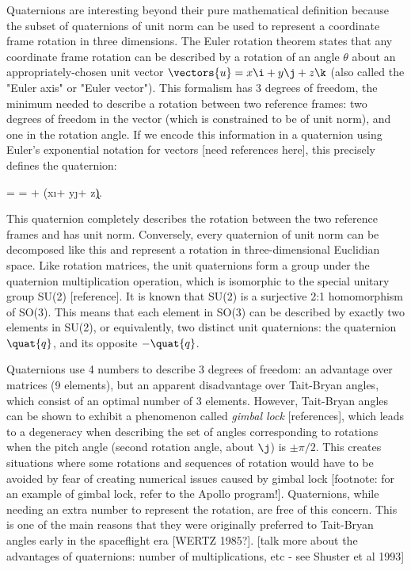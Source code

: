 Quaternions are interesting beyond their pure mathematical definition because the subset of quaternions of unit norm can be used to represent a coordinate frame rotation in three dimensions. The Euler rotation theorem states that any coordinate frame rotation can be described by a rotation of an angle $\theta$ about an appropriately-chosen unit vector $\vectors{u} = x\i + y\j + z\k$ (also called the "Euler axis" or "Euler vector"). This formalism has 3 degrees of freedom, the minimum needed to describe a rotation between two reference frames: two degrees of freedom in the vector (which is constrained to be of unit norm), and one in the rotation angle. If we encode this information in a quaternion using Euler's exponential notation for vectors [need references here], this precisely defines the quaternion:
\begin{equations}
 = \exp{} = \cos{} + (x\i + y\j + z\k)\sin{}.
\end{equations}
This quaternion completely describes the rotation between the two reference frames and has unit norm. Conversely, every quaternion of unit norm can be decomposed like this and represent a rotation in three-dimensional Euclidian space. Like rotation matrices, the unit quaternions form a group under the quaternion multiplication operation, which is isomorphic to the special unitary group SU(2) [reference]. It is known that SU(2) is a surjective 2:1 homomorphism of SO(3). This means that each element in SO(3) can be described by exactly two elements in SU(2), or equivalently, two distinct unit quaternions: the quaternion $\quat{q}$, and its opposite $-\quat{q}$.

Quaternions use 4 numbers to describe 3 degrees of freedom: an advantage over matrices (9 elements), but an apparent disadvantage over Tait-Bryan angles, which consist of an optimal number of 3 elements. However, Tait-Bryan angles can be shown to exhibit a phenomenon called \textit{gimbal lock} [references], which leads to a degeneracy when describing the set of angles corresponding to rotations when the pitch angle (second rotation angle, about $\j$) is $\pm\pi/2$. This creates situations where some rotations and sequences of rotation would have to be avoided by fear of creating numerical issues caused by gimbal lock [footnote: for an example of gimbal lock, refer to the Apollo program!]. Quaternions, while needing an extra number to represent the rotation, are free of this concern. This is one of the main reasons that they were originally preferred to Tait-Bryan angles early in the spaceflight era [WERTZ 1985?]. [talk more about the advantages of quaternions: number of multiplications, etc - see Shuster et al 1993]

